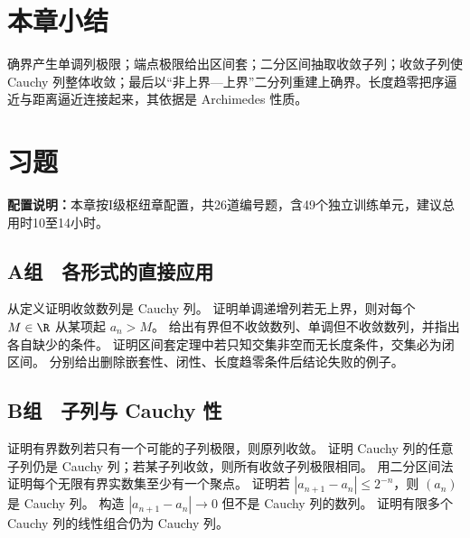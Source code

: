 \section*{本章小结}

确界产生单调列极限；端点极限给出区间套；二分区间抽取收敛子列；收敛子列使 Cauchy 列整体收敛；最后以“非上界—上界”二分列重建上确界。长度趋零把序逼近与距离逼近连接起来，其依据是 Archimedes 性质。

\section*{习题}

\noindent\textbf{配置说明：}本章按I级枢纽章配置，共26道编号题，含49个独立训练单元，建议总用时10至14小时。

\subsection*{A组　各形式的直接应用}
\begin{enumerate}[label=\textbf{6.\arabic*.}]
  \mustdo 从定义证明收敛数列是 Cauchy 列。
  \mustdo 证明单调递增列若无上界，则对每个 \(M\in\R\) 从某项起 \(a_n>M\)。
  \mustdo 给出有界但不收敛数列、单调但不收敛数列，并指出各自缺少的条件。
  \mustdo 证明区间套定理中若只知交集非空而无长度条件，交集必为闭区间。
  \mustdo 分别给出删除嵌套性、闭性、长度趋零条件后结论失败的例子。
\end{enumerate}

\subsection*{B组　子列与 Cauchy 性}
\begin{enumerate}[label=\textbf{6.\arabic*.},resume]
  \mustdo 证明有界数列若只有一个可能的子列极限，则原列收敛。
  \mustdo 证明 Cauchy 列的任意子列仍是 Cauchy 列；若某子列收敛，则所有收敛子列极限相同。
  \mustdo 用二分区间法证明每个无限有界实数集至少有一个聚点。
  \mustdo 证明若 \(|a_{n+1}-a_n|\le2^{-n}\)，则 \((a_n)\) 是 Cauchy 列。
  \optionaldo 构造 \(|a_{n+1}-a_n|\to0\) 但不是 Cauchy 列的数列。
  \mustdo 证明有限多个 Cauchy 列的线性组合仍为 Cauchy 列。
\end{enumerate}

